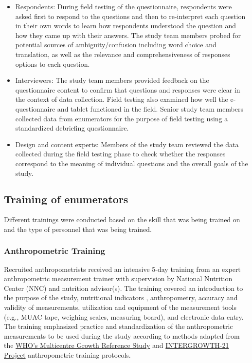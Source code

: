 \documentclass[12pt,a4paper]{article}
\begin{document}
\begin{itemize}
\item
  Respondents: During field testing of the questionnaire, respondents were asked first to respond to the questions and then to re-interpret each question in their own words to learn how respondents understood the question and how they came up with their answers. The study team members probed for potential sources of ambiguity/confusion including word choice and translation, as well as the relevance and comprehensiveness of responses options to each question.
\item
  Interviewers: The study team members provided feedback on the questionnaire content to confirm that questions and responses were clear in the context of data collection. Field testing also examined how well the e-questionnaire and tablet functioned in the field. Senior study team members collected data from enumerators for the purpose of field testing using a standardized debriefing questionnaire.
\item
  Design and content experts: Members of the study team reviewed the data collected during the field testing phase to check whether the responses correspond to the meaning of individual questions and the overall goals of the study.
\end{itemize}

\hypertarget{training}{%
\subsection{Training of enumerators}\label{training}}

Different trainings were conducted based on the skill that was being trained on and the type of personnel that was being trained.

\hypertarget{anthro-training}{%
\subsubsection{Anthropometric Training}\label{anthro-training}}

Recruited anthropometrists received an intensive 5-day training from an expert anthropometric measurement trainer with supervision by National Nutrition Center (NNC) and nutrition advisor(s). The training covered an introduction to the purpose of the study, nutritional indicators , anthropometry, accuracy and validity of measurements, utilization and equipment of the measurement tools (e.g., MUAC tape, weighing scales, measuring board), and electronic data entry. The training emphasized practice and standardization of the anthropometric measurements to be used during the study according to methods adapted from the \href{https://www.who.int/childgrowth/mgrs/en/}{WHO's Multicentre Growth Reference Study} \citep{DeOnis2004} and \href{https://intergrowth21.tghn.org}{INTERGROWTH-21 Project} \citep{Ismail2013} anthropometric training protocols.
\end{document}
